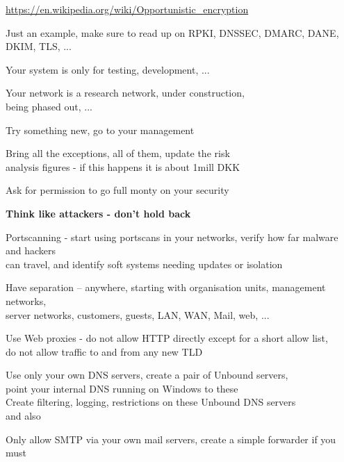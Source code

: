 \documentclass[Screen16to9,17pt]{foils}
\begin{document}
\begin{list2}
\item \url{https://en.wikipedia.org/wiki/Opportunistic_encryption}
\item Just an example, make sure to read up on RPKI, DNSSEC, DMARC, DANE, DKIM, TLS, ...
\end{list2}



Your system is only for testing, development, ...

Your network is a research network, under construction, \\
being phased out, ...

Try something new, go to your management

Bring all the exceptions, all of them, update the risk \\
analysis figures - if this happens it is about 1mill DKK

Ask for permission to go full monty on your security

{\bf Think like attackers - don't hold back}






\begin{list2}
\item Portscanning - start using portscans in your networks, verify how far malware and hackers\\
 can travel, and identify soft systems needing updates or isolation
\item Have separation -- anywhere, starting with organisation units, management networks,\\
server networks, customers, guests, LAN, WAN, Mail, web, ...
\item Use Web proxies - do not allow HTTP directly except for a short allow list, \\
do not allow traffic to and from any new TLD
\item Use only your own DNS servers, create a pair of Unbound servers, \\
point your internal DNS running on Windows to these\\
Create filtering, logging, restrictions on these Unbound DNS servers\\
 and also 
\item Only allow SMTP via your own mail servers, create a simple forwarder if you must
\end{list2}
\end{document}
